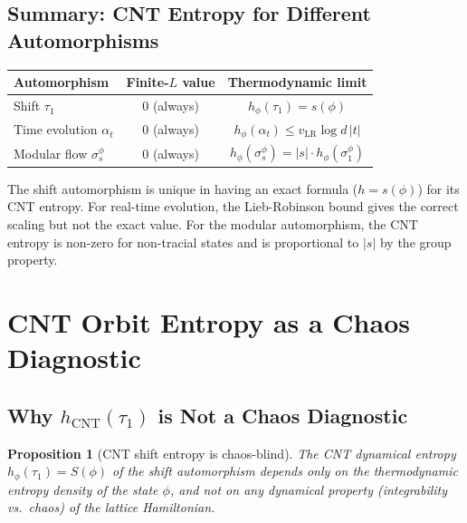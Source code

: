 \documentclass[12pt,a4paper]{article}
\newtheorem{proposition}[theorem]{Proposition}
\begin{document}
\subsection{Summary: CNT Entropy for Different Automorphisms}

\begin{center}
\begin{tabular}{@{}lcc@{}}
\toprule
\textbf{Automorphism} & \textbf{Finite-$L$ value} & \textbf{Thermodynamic limit} \\
\midrule
Shift $\tau_1$ & 0 (always) & $h_\phi(\tau_1)=s(\phi)$ \\
Time evolution $\alpha_t$ & 0 (always) & $h_\phi(\alpha_t)\le v_\mathrm{LR}\log d\,|t|$ \\
Modular flow $\sigma^\phi_s$ & 0 (always) & $h_\phi(\sigma^\phi_s)=|s|\cdot h_\phi(\sigma^\phi_1)$ \\
\bottomrule
\end{tabular}
\end{center}

The shift automorphism is unique in having an exact formula ($h=s(\phi)$) for its CNT entropy.
For real-time evolution, the Lieb-Robinson bound gives the correct scaling but not the exact value.
For the modular automorphism, the CNT entropy is non-zero for non-tracial states and is
proportional to $|s|$ by the group property.

\section{CNT Orbit Entropy as a Chaos Diagnostic}
\label{sec:chaos_diagnostic}

\subsection{Why $h_\mathrm{CNT}(\tau_1)$ is Not a Chaos Diagnostic}

\begin{proposition}[CNT shift entropy is chaos-blind]\label{prop:shift_chaos_blind}
The CNT dynamical entropy $h_\phi(\tau_1)=S(\phi)$ of the shift automorphism
depends only on the thermodynamic entropy density of the state $\phi$, and not
on any dynamical property (integrability vs.\ chaos) of the lattice Hamiltonian.
\end{proposition}
\end{document}
